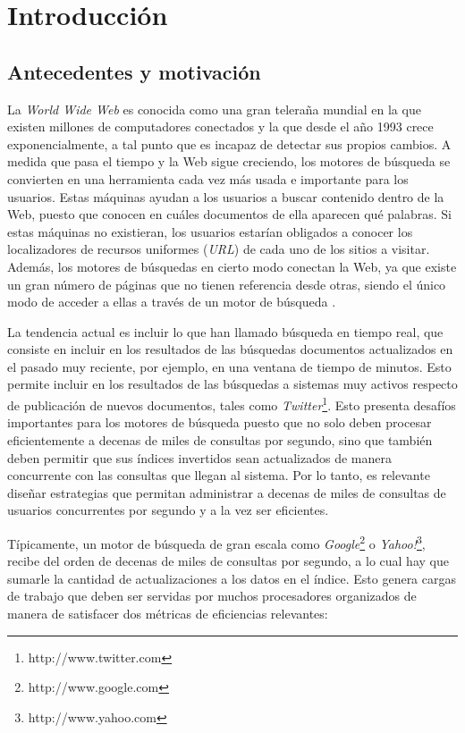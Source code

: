 \chapter{Introducci\'on}
\label{cap:intro}


\section{Antecedentes y motivaci\'on}
\label{intro:motivacion}
La \textit{World Wide Web} es conocida como una gran teleraña mundial en la que existen millones de computadores conectados y la que desde el año 1993 crece exponencialmente, a tal punto que es incapaz de detectar sus propios cambios. A medida que pasa el tiempo y la Web sigue creciendo, los motores de búsqueda se convierten en una herramienta cada vez más usada e importante para los usuarios. Estas máquinas ayudan a los usuarios a buscar contenido dentro de la Web, puesto que conocen en cuáles documentos de ella aparecen qué palabras. Si estas máquinas no existieran, los usuarios estarían obligados a conocer los localizadores de recursos uniformes (\textit{URL}) de cada uno de los sitios a visitar. Además, los motores de búsquedas en cierto modo conectan la Web, ya que existe un gran número de páginas que no tienen referencia desde otras, siendo el único modo de acceder a ellas a través de un motor de búsqueda \citep{Baeza-Yates:2008}.  

La tendencia actual es incluir lo que han llamado búsqueda en tiempo real, que consiste en incluir en los resultados de las búsquedas documentos actualizados en el pasado muy reciente, por ejemplo, en una ventana de tiempo de minutos. Esto permite incluir en los resultados de las búsquedas a sistemas muy activos respecto de publicación de nuevos documentos, tales como \textit{Twitter}\footnote{http://www.twitter.com}. Esto presenta desafíos importantes para los motores de búsqueda puesto que no solo deben procesar eficientemente a decenas de miles de consultas por segundo, sino que también deben permitir que sus índices invertidos \citep{Zobel:2006} sean actualizados de manera concurrente con las consultas que llegan al sistema. Por lo tanto, es relevante diseñar estrategias que permitan administrar a decenas de miles de consultas de usuarios concurrentes por segundo y a la vez ser eficientes.

Típicamente, un motor de búsqueda de gran escala como \textit{Google}\footnote{http://www.google.com} o \textit{Yahoo!}\footnote{http://www.yahoo.com}, recibe del orden de decenas de miles de consultas por segundo, a lo cual hay que sumarle la cantidad de actualizaciones a los datos en el índice. Esto genera cargas de trabajo que deben ser servidas por muchos procesadores organizados de manera de satisfacer dos métricas de eficiencias relevantes:

